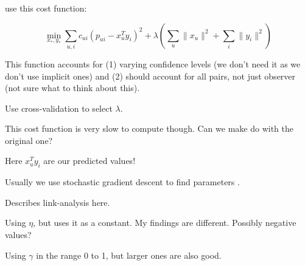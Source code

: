 \cite{hu2008collaborative} use this cost function:

\begin{equation}
    \min_{x_*, y_*} \sum_{u,i} c_{ui} (p_{ui} - x_{u}^T y_i)^2 + \lambda(\sum_{u} \|x_u\|^2 + \sum_{i} \|y_i\|^2)
\end{equation}

This function accounts for (1) varying confidence levels (we don't need it as we don't use implicit ones) and (2) should account for all pairs, not just observer (not sure what to think about this).

Use cross-validation to select $\lambda$.

This cost function is very slow to compute though. Can we make do with the original one?

Here $x_{u}^T y_i$ are our predicted values!

Usually we use stochastic gradient descent to find parameters \cite{hu2008collaborative}.

Describes link-analysis here.


Using $\eta$, but uses it as a constant. My findings are different. Possibly negative values?

Using $\gamma$ in the range 0 to 1, but larger ones are also good.



